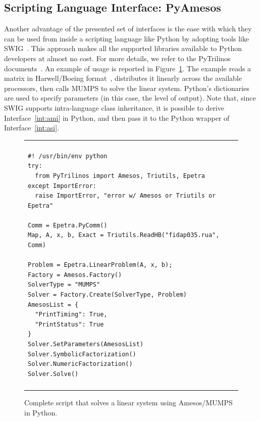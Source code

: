 \documentclass[acmtocl]{acmtrans2m}
\newcommand{\amesos}{{\sc Amesos}}
\begin{document}
\subsection{Scripting Language Interface: PyAmesos}
\label{sec:pyamesos}

Another advantage of the presented set of interfaces is the ease with which
they can be used from inside a scripting language like Python by adopting
tools like SWIG~\cite{swig}. This approach makes all the supported libraries
available to Python developers at almost no cost. For more details, we refer
to the PyTrilinos documents~\cite{sala05pytrilinos,pytrilinos-la-guide}.  An
example of usage is reported in Figure~\ref{fig:pyamesos}. The example reads a
matrix in Harwell/Boeing format~\cite{duff89sparse}, distributes it linearly
across the available processors, then calls MUMPS to solve the linear system.
Python's dictionaries are used to specify parameters (in this case, the level
                                                      of output). Note that,
  since SWIG supports intra-language class inheritance, it is possible to
  derive Interface~\ref{int:ami} in Python, and then pass it to the Python
  wrapper of Interface~\ref{int:asi}. 

\begin{figure}
\begin{center}
\begin{tabular}{| p{12cm} |}
\hline
\\
\footnotesize
\begin{minipage}{11.5cm}
\begin{verbatim}
#! /usr/bin/env python
try:
  from PyTrilinos import Amesos, Triutils, Epetra
except ImportError:
  raise ImportError, "error w/ Amesos or Triutils or Epetra"

Comm = Epetra.PyComm()
Map, A, x, b, Exact = Triutils.ReadHB("fidap035.rua", Comm)

Problem = Epetra.LinearProblem(A, x, b);
Factory = Amesos.Factory()
SolverType = "MUMPS"
Solver = Factory.Create(SolverType, Problem)
AmesosList = {
  "PrintTiming": True,
  "PrintStatus": True
}
Solver.SetParameters(AmesosList)
Solver.SymbolicFactorization()
Solver.NumericFactorization()
Solver.Solve()
\end{verbatim}
\end{minipage}
\\
\\
\hline
\end{tabular}
\caption{Complete script that solves a linear system using \amesos/MUMPS in
  Python.}
\label{fig:pyamesos}
\end{center}
\end{figure}
\end{document}
